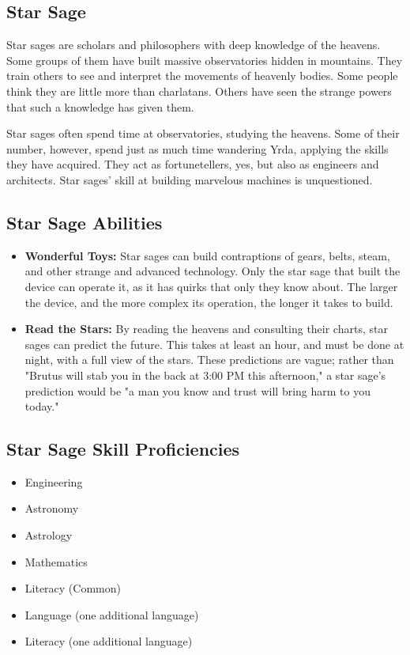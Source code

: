 \begin{multicols}{2}
\section{Star Sage}

Star sages are scholars and philosophers with deep knowledge of the heavens.
Some groups of them have built massive observatories hidden in mountains. They
train others to see and interpret the movements of heavenly bodies. Some people
think they are little more than charlatans. Others have seen the strange powers
that such a knowledge has given them.

Star sages often spend time at observatories, studying the heavens. Some of their
number, however, spend just as much time wandering Yrda, applying the skills they
have acquired. They act as fortunetellers, yes, but also as engineers and architects.
Star sages' skill at building marvelous machines is unquestioned.

\subsection{Star Sage Abilities}

\begin{itemize}
  \item \textbf{Wonderful Toys:} Star sages can build contraptions of gears, belts,
    steam, and other strange and advanced technology. Only the star sage that built
    the device can operate it, as it has quirks that only they know about. The larger
    the device, and the more complex its operation, the longer it takes to build.
  \item \textbf{Read the Stars:} By reading the heavens and consulting their charts,
    star sages can predict the future. This takes at least an hour, and must be done
    at night, with a full view of the stars. These predictions are vague; rather than
    "Brutus will stab you in the back at 3:00 PM this afternoon," a star sage's prediction
    would be "a man you know and trust will bring harm to you today."
\end{itemize}

\subsection{Star Sage Skill Proficiencies}

\begin{itemize}
  \item Engineering
  \item Astronomy
  \item Astrology
  \item Mathematics
  \item Literacy (Common)
  \item Language (one additional language)
  \item Literacy (one additional language)
\end{itemize}


\end{multicols}
